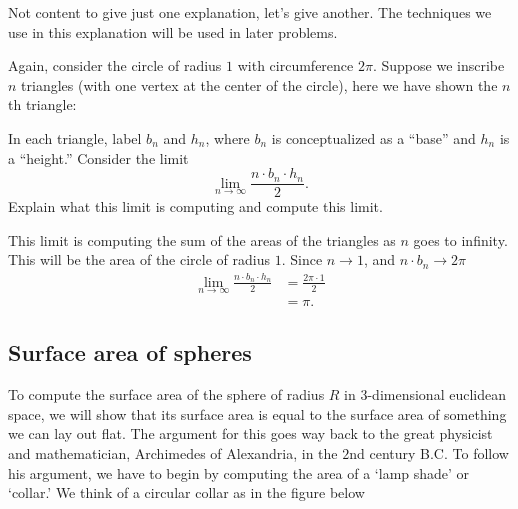 \documentclass[newpage,hints,handout,noauthor,nooutcomes,12pt]{ximera}
\begin{document}
Not content to give just one explanation, let's give another. The
techniques we use in this explanation will be used in later problems.

\begin{problem}
Again, consider the circle of radius $1$ with circumference $2\pi$.
Suppose we inscribe $n$ triangles (with one vertex at the center of
the circle), here we have shown the $n$th triangle:
\begin{image}
\end{image}
In each triangle, label $b_n$ and $h_n$, where $b_n$ is conceptualized
as a ``base'' and $h_n$ is a ``height.''  Consider the limit
\[
\lim_{n\to\infty} \frac{n\cdot b_n\cdot h_n}{2}.
\]
Explain what this limit is computing and compute this limit.
\begin{freeResponse}
This limit is computing the sum of the areas of the triangles as $n$
goes to infinity. This will be the area of the circle of radius
$1$. Since $n\to 1$, and $n\cdot b_n\to 2\pi$
\begin{align*}
\lim_{n\to\infty} \frac{n\cdot b_n\cdot h_n}{2} &= \frac{2\pi\cdot 1}{2}\\
&=\pi.
\end{align*}
\end{freeResponse}
\end{problem}


\subsection{Surface area of spheres}

To compute the surface area of the sphere of radius $R$ in $3$-dimensional
euclidean space, we will show that its surface area is equal to the surface
area of something we can lay out flat. The argument for this goes way back to
the great physicist and mathematician, Archimedes of Alexandria, in the $2$nd
century B.C. To follow his argument, we have to begin by computing the area of
a `lamp shade' or `collar.' We think of a circular collar as in the figure
below
\end{document}
